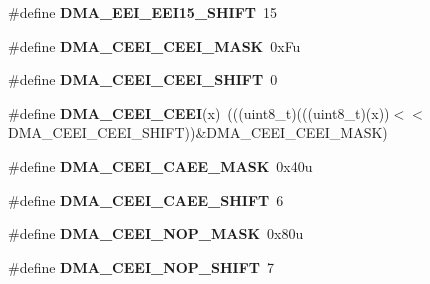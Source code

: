 \begin{DoxyCompactItemize}
\item 
\#define {\bfseries D\+M\+A\+\_\+\+E\+E\+I\+\_\+\+E\+E\+I15\+\_\+\+S\+H\+I\+FT}~15\hypertarget{group__DMA__Register__Masks_ga442bb0da667094767c2f8acc8fc5f4e7}{}\label{group__DMA__Register__Masks_ga442bb0da667094767c2f8acc8fc5f4e7}

\item 
\#define {\bfseries D\+M\+A\+\_\+\+C\+E\+E\+I\+\_\+\+C\+E\+E\+I\+\_\+\+M\+A\+SK}~0x\+Fu\hypertarget{group__DMA__Register__Masks_gaac1e3fb6ff551f58fe6c43c5b10a6186}{}\label{group__DMA__Register__Masks_gaac1e3fb6ff551f58fe6c43c5b10a6186}

\item 
\#define {\bfseries D\+M\+A\+\_\+\+C\+E\+E\+I\+\_\+\+C\+E\+E\+I\+\_\+\+S\+H\+I\+FT}~0\hypertarget{group__DMA__Register__Masks_ga66ffe3efeb446f55654d3ac90abf1cb6}{}\label{group__DMA__Register__Masks_ga66ffe3efeb446f55654d3ac90abf1cb6}

\item 
\#define {\bfseries D\+M\+A\+\_\+\+C\+E\+E\+I\+\_\+\+C\+E\+EI}(x)~(((uint8\+\_\+t)(((uint8\+\_\+t)(x))$<$$<$D\+M\+A\+\_\+\+C\+E\+E\+I\+\_\+\+C\+E\+E\+I\+\_\+\+S\+H\+I\+FT))\&D\+M\+A\+\_\+\+C\+E\+E\+I\+\_\+\+C\+E\+E\+I\+\_\+\+M\+A\+SK)\hypertarget{group__DMA__Register__Masks_gaf1db6175a973e40e11a4ac87ee231096}{}\label{group__DMA__Register__Masks_gaf1db6175a973e40e11a4ac87ee231096}

\item 
\#define {\bfseries D\+M\+A\+\_\+\+C\+E\+E\+I\+\_\+\+C\+A\+E\+E\+\_\+\+M\+A\+SK}~0x40u\hypertarget{group__DMA__Register__Masks_ga386c3018389f0adce8b163c90bc171b7}{}\label{group__DMA__Register__Masks_ga386c3018389f0adce8b163c90bc171b7}

\item 
\#define {\bfseries D\+M\+A\+\_\+\+C\+E\+E\+I\+\_\+\+C\+A\+E\+E\+\_\+\+S\+H\+I\+FT}~6\hypertarget{group__DMA__Register__Masks_ga389695175eaab975f78ed66669e467df}{}\label{group__DMA__Register__Masks_ga389695175eaab975f78ed66669e467df}

\item 
\#define {\bfseries D\+M\+A\+\_\+\+C\+E\+E\+I\+\_\+\+N\+O\+P\+\_\+\+M\+A\+SK}~0x80u\hypertarget{group__DMA__Register__Masks_ga5b85e28933ce4120f8a8542972b92115}{}\label{group__DMA__Register__Masks_ga5b85e28933ce4120f8a8542972b92115}

\item 
\#define {\bfseries D\+M\+A\+\_\+\+C\+E\+E\+I\+\_\+\+N\+O\+P\+\_\+\+S\+H\+I\+FT}~7\hypertarget{group__DMA__Register__Masks_gaa6681149d6d175500734c3ae71842eba}{}\label{group__DMA__Register__Masks_gaa6681149d6d175500734c3ae71842eba}


\end{DoxyCompactItemize}
